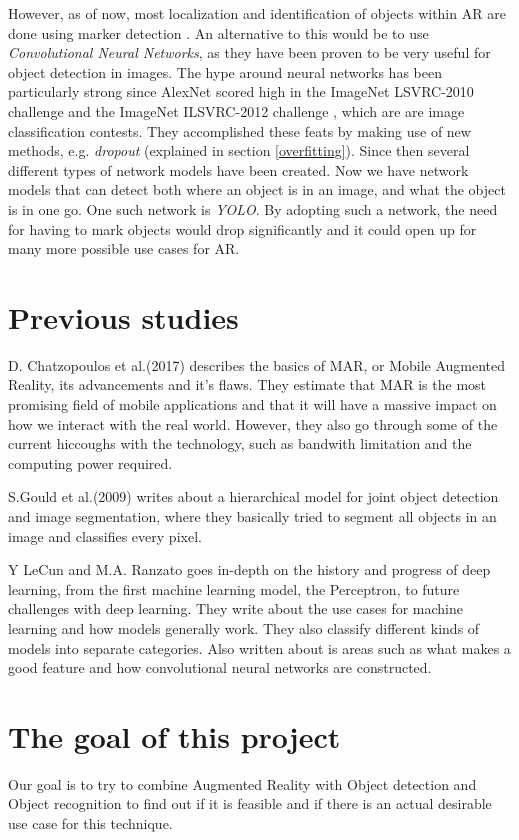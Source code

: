 However, as of now, most localization and identification of objects within AR are done using 
marker detection \cite{markerDetection}. An alternative to this would be to use 
\textit{Convolutional Neural Networks}, as they have been proven to be very useful for 
object detection in 
images. The hype around neural networks has been particularly strong since AlexNet scored 
high in the ImageNet LSVRC-2010 challenge and the ImageNet ILSVRC-2012 challenge 
\cite{NIPS2012_4824}, which are are image classification contests. They accomplished these feats by making use of new methods, e.g. 
\textit{dropout} (explained in section \ref{overfitting}). Since then several different types of network models have been created. 
Now we have network models that can detect both where an object is in an image, and what 
the object is in one go. One such network is \textit{YOLO}\cite{YOLO1}. By adopting such a 
network, the need for having to mark objects would drop significantly and it could open up 
for many more possible use cases for AR.
 
\section{Previous studies}
\label{subsecPrevStud}
D. Chatzopoulos et al.(2017) describes the basics of MAR, or Mobile Augmented Reality, its advancements and it's flaws. They estimate that MAR is the most promising field of mobile applications and that it will have a massive impact on how we interact with the real world. However, they also go through some of the current hiccoughs with the technology, such as bandwith limitation and the computing power required. 
\cite{MARS}

S.Gould et al.(2009) writes about a hierarchical model for joint object detection and image segmentation, where they basically tried to segment all objects in an image and classifies every pixel. 
\cite{NIPS2009_3766}


Y LeCun and M.A. Ranzato goes in-depth on the history and progress of deep learning, from the first machine learning model, the Perceptron, to future challenges with deep learning. They write about the use cases for machine learning and how models generally work. They also classify different kinds of models into separate categories. Also written about is areas such as what makes a good feature and how convolutional neural networks are constructed.
\cite{deepLearningTutorial}


\section{The goal of this project}
\label{subsecGoal}
Our goal is to try to combine Augmented Reality with Object detection and Object recognition to find out if it is feasible and if there is an actual desirable use case for this technique. 

